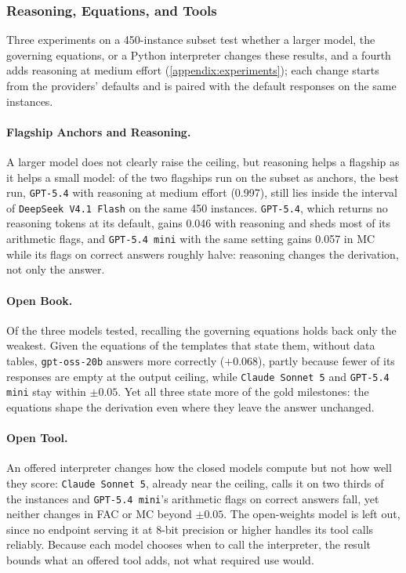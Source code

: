 \subsubsection{Reasoning, Equations, and Tools}
\label{subsec:reasoning_equations_tools}

Three experiments on a 450-instance subset test whether a larger model, the governing equations, or
a Python interpreter changes these results, and a fourth adds reasoning at medium effort
(\autoref{appendix:experiments}); each change starts from the providers' defaults and is paired with
the default responses on the same instances.

\paragraph{Flagship Anchors and Reasoning.} A larger model does not clearly raise the ceiling, but
reasoning helps a flagship as it helps a small model: of the two flagships run on the subset as
anchors, the best run, \texttt{GPT-5.4} with reasoning at medium effort (0.997), still lies inside
the interval of \texttt{DeepSeek V4.1 Flash} on the same 450 instances.
\texttt{GPT-5.4}, which returns no reasoning tokens at its default, gains 0.046 with reasoning and
sheds most of its arithmetic flags, and \texttt{GPT-5.4 mini} with the same setting gains 0.057 in
MC while its flags on correct answers roughly halve: reasoning changes the derivation, not only the
answer.

\paragraph{Open Book.} Of the three models tested, recalling the governing equations holds back only
the weakest.
Given the equations of the templates that state them, without data tables, \texttt{gpt-oss-20b}
answers more correctly ($+0.068$), partly because fewer of its responses are empty at the output
ceiling, while \texttt{Claude Sonnet 5} and \texttt{GPT-5.4 mini} stay within $\pm 0.05$.
Yet all three state more of the gold milestones: the equations shape the derivation even where they
leave the answer unchanged.

\paragraph{Open Tool.} An offered interpreter changes how the closed models compute but not how
well they score: \texttt{Claude Sonnet 5}, already near the ceiling, calls it on two thirds of the
instances and \texttt{GPT-5.4 mini}'s arithmetic flags on correct answers fall, yet neither changes
in FAC or MC beyond $\pm 0.05$.
The open-weights model is left out, since no endpoint serving it at 8-bit precision or higher
handles its tool calls reliably.
Because each model chooses when to call the interpreter, the result bounds what an offered tool
adds, not what required use would.

